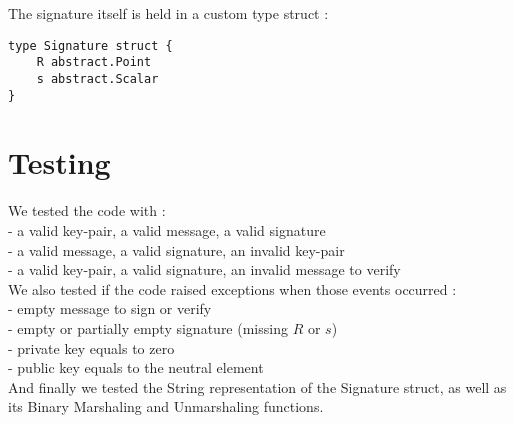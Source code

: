 \documentclass{article}
\begin{document}
\noindent
The signature itself is held in a custom type struct :
\begin{verbatim}
type Signature struct {
    R abstract.Point
    s abstract.Scalar
}    
\end{verbatim}





\section{Testing}

We tested the code with : \\
- a valid key-pair, a valid message, a valid signature \\
- a valid message, a valid signature, an invalid key-pair \\
- a valid key-pair, a valid signature, an invalid message to verify \\

\noindent
We also tested if the code raised exceptions when those events occurred : \\
- empty message to sign or verify \\
- empty or partially empty signature (missing $R$ or $s$) \\
- private key equals to zero \\
- public key equals to the neutral element \\

\noindent
And finally we tested the String representation of the Signature struct, as well as its Binary Marshaling and Unmarshaling functions.
\end{document}
